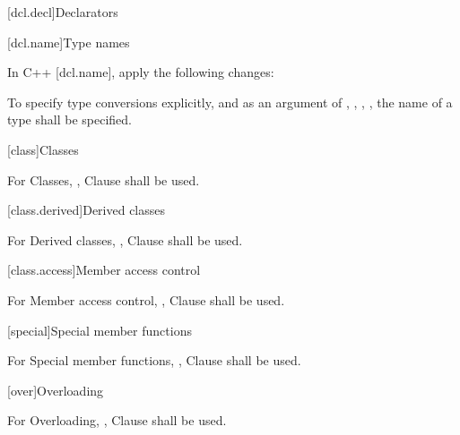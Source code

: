 
[dcl.decl]{Declarators}

[dcl.name]{Type names}

\pnum
In C++ [dcl.name], apply the following changes:

\begin{std.txt}
To specify type conversions explicitly, and as an argument of ,
, ,  ,  the name of a type shall be specified.
\end{std.txt}

[class]{Classes}

For Classes, {\cppstddocno}, Clause \the\value{chapter} shall be used.

[class.derived]{Derived classes}

For Derived classes, {\cppstddocno}, Clause \the\value{chapter} shall be used.

[class.access]{Member access control}

For Member access control, {\cppstddocno}, Clause \the\value{chapter} shall be used.

[special]{Special member functions}

For Special member functions, {\cppstddocno}, Clause \the\value{chapter} shall be used.

[over]{Overloading}

For Overloading, {\cppstddocno}, Clause \the\value{chapter} shall be used.
